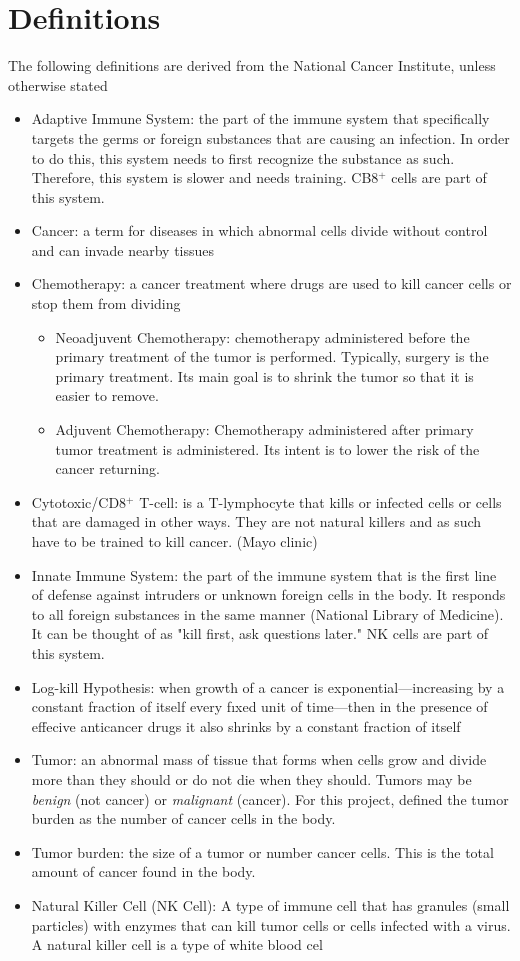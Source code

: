 \documentclass[11pt]{amsart}
\begin{document}
\section{Definitions}
\label{appendix: defs}
The following definitions are derived from the National Cancer Institute, unless otherwise stated
\begin{itemize}
	\item Adaptive Immune System: the part of the immune system that specifically targets the germs or foreign substances that are causing an infection. In order to do this, this system needs to first recognize the substance as such. Therefore, this system is slower and needs training. CB8$^+$ cells are part of this system.
	\item Cancer:  a term for diseases in which abnormal cells divide without control and can invade nearby tissues
	\item Chemotherapy: a cancer treatment where drugs are used to kill cancer cells or stop them from dividing
		\begin{itemize}
			\item Neoadjuvent Chemotherapy: chemotherapy administered before the primary treatment of the tumor is performed. Typically, surgery is the primary treatment. Its main goal is to shrink the tumor so that it is easier to remove.
			\item Adjuvent Chemotherapy: Chemotherapy administered after primary tumor treatment is administered. Its intent is to lower the risk of the cancer returning.
		\end{itemize}
	\item Cytotoxic/CD8$^+$ T-cell: is a T-lymphocyte that kills or infected cells or cells that are damaged in other ways. They are not natural killers and as such have to be trained to kill cancer. (Mayo clinic)
	\item Innate Immune System: the part of the immune system that is the first line of defense against intruders or unknown foreign cells in the body. It responds to all foreign substances in the same manner (National Library of Medicine). It can be thought of as "kill first, ask questions later." NK cells are part of this system.
	\item Log-kill Hypothesis: when growth of a cancer is exponential—increasing by a constant fraction of itself every fıxed unit of time—then in the presence of effecive anticancer drugs it also shrinks by a constant fraction \cite{LogKill}
of itself
	\item Tumor: an abnormal mass of tissue that forms when cells grow and divide more than they should or do not die when they should. Tumors may be \textit{benign} (not cancer) or \textit{malignant} (cancer). For this project, defined the tumor burden as the number of cancer cells in the body.
	\item Tumor burden: the size of a tumor or number cancer cells. This is the total amount of cancer found in the body.
        \item Natural Killer Cell (NK Cell): A type of immune cell that has granules (small particles) with enzymes that can kill tumor cells or cells infected with a virus. A natural killer cell is a type of white blood cel
\end{itemize}
\end{document}
